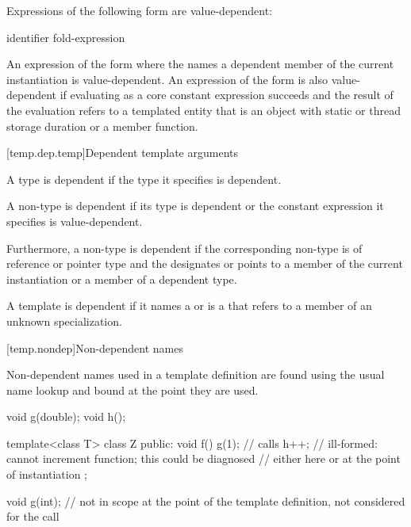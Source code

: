 \pnum
Expressions of the following form are value-dependent:

\begin{ncsimplebnf}
  \terminal{(} identifier \terminal{)}\br
fold-expression
\end{ncsimplebnf}

\pnum
An expression of the form \tcode{\&} where the
 names a dependent member of the current
instantiation is value-dependent.
An expression of the form \tcode{\&}
is also value-dependent if evaluating 
as a core constant expression succeeds and
the result of the evaluation refers to a templated entity
that is an object with static or thread storage duration or a member function.

[temp.dep.temp]{Dependent template arguments}

\pnum
A type
is dependent if the type it specifies is dependent.

\pnum
A non-type
is dependent if its type is dependent or the constant
expression it specifies is value-dependent.

\pnum
Furthermore, a non-type
is dependent if the corresponding non-type 
is of reference or pointer type and the 
designates or points to a member of the current instantiation or a member of
a dependent type.

\pnum
A template
is dependent if it names a
or is a
that refers to a member of an unknown specialization.

[temp.nondep]{Non-dependent names}

\pnum
Non-dependent names used in a template definition are found using the
usual name lookup and bound at the point they are used.
\begin{example}

\begin{codeblock}
void g(double);
void h();

template<class T> class Z {
public:
  void f() {
    g(1);           // calls 
    h++;            // ill-formed: cannot increment function; this could be diagnosed
                    // either here or at the point of instantiation
  }
};

void g(int);        // not in scope at the point of the template definition, not considered for the call 
\end{codeblock}
\end{example}

